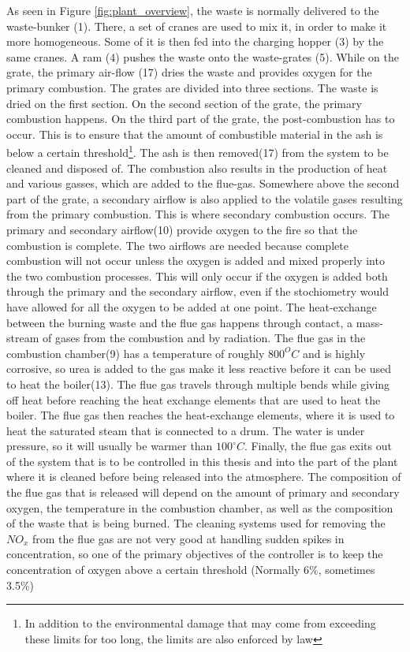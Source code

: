 As seen in Figure \ref{fig:plant_overview}, the waste is normally delivered to the waste-bunker (1). There, a set of cranes are used to mix it, in order to make it more homogeneous. Some of it is then fed into the charging hopper (3) by the same cranes. A ram (4) pushes the waste onto the waste-grates (5). While on the grate, the primary air-flow (17) dries the waste and provides oxygen for the primary combustion. The grates are divided into three sections. The waste is dried on the first section. On the second section of the grate, the primary combustion happens. On the third part of the grate, the post-combustion has to occur. This is to ensure that the amount of combustible material in the ash is below a certain threshold\footnote{In addition to the environmental damage that may come from exceeding these limits for too long, the limits are also enforced by law}. The ash is then removed(17) from the system to be cleaned and disposed of. The combustion also results in the production of heat and various gasses, which are added to the flue-gas. Somewhere above the second part of the grate, a secondary airflow is also applied to the volatile gases resulting from the primary combustion. This is where secondary combustion occurs. The primary and secondary airflow(10) provide oxygen to the fire so that the combustion is complete. The two airflows are needed because complete combustion will not occur unless the oxygen is added and mixed properly into the two combustion processes. This will only occur if the oxygen is added both through the primary and the secondary airflow, even if the stochiometry would have allowed for all the oxygen to be added at one point. The heat-exchange between the burning waste and the flue gas happens through contact, a mass-stream of gases from the combustion and by radiation. The flue gas in the combustion chamber(9) has a temperature of roughly $800^O C$ and is highly corrosive, so urea is added to the gas make it less reactive  before it can be used to heat the boiler(13). The flue gas travels through multiple bends while giving off heat before reaching the heat exchange elements that are used to heat the boiler. The flue gas then reaches the heat-exchange elements, where it is used to heat the saturated steam that is connected to a drum. The water is under pressure, so it will usually be warmer than $100^\circ C$. Finally, the flue gas exits out of the system that is to be controlled in this thesis and into the part of the plant where it is cleaned before being released into the atmosphere. The composition of the flue gas that is released will depend on the amount of primary and secondary oxygen, the temperature in the combustion chamber, as well as the composition of the waste that is being burned. The cleaning systems used for removing the $NO_x$ from the flue gas are not very good at handling sudden spikes in concentration, so one of the primary objectives of the controller is to keep the concentration of oxygen above a certain threshold (Normally 6\%, sometimes 3.5\%)

